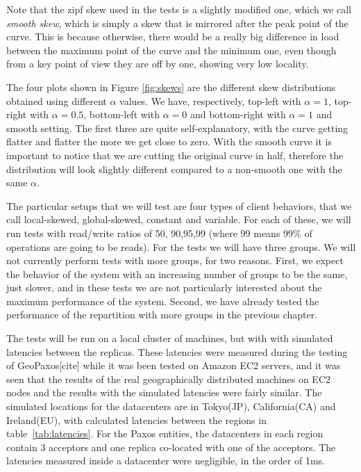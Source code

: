 Note that the zipf skew used in the tests is a slightly modified one, which we call \emph{smooth skew}, which is simply a skew that is mirrored after the peak point of the curve. This is because otherwise, there would be a really big difference in load between the maximum point of the curve and the minimum one, even though from a key point of view they are off by one, showing very low locality.

The four plots shown in Figure \ref{fig:skews} are the different skew distributions obtained using different $\alpha$ values. We have, respectively, top-left with $\alpha = 1$, top-right with $\alpha = 0.5$, bottom-left with $\alpha = 0$ and bottom-right with $\alpha = 1$ and smooth setting. The first three are quite self-explanatory, with the curve getting flatter and flatter the more we get close to zero. With the smooth curve it is important to notice that we are cutting the original curve in half, therefore the distribution will look slightly different compared to a non-smooth one with the same $\alpha$.

The particular setups that we will test are four types of client behaviors, that we call local-skewed, global-skewed, constant and variable. For each of these, we will run tests with read/write ratios of 50, 90,95,99 (where 99 means 99\% of operations are going to be reads). For the tests we will have three groups. We will not currently perform tests with more groups, for two reasons. First, we expect the behavior of the system with an increasing number of groups to be the same, just slower, and in these tests we are not particularly interested about the maximum performance of the system. Second, we have already tested the performance of the repartition with more groups in the previous chapter.

The tests will be run on a local cluster of machines, but with with simulated latencies between the replicas. These latencies were measured during the testing of GeoPaxos[cite] while it was been tested on Amazon EC2 servers, and it was seen that the results of the real geographically distributed machines on EC2 nodes and the results with the simulated latencies were fairly similar. The simulated locations for the datacenters are in Tokyo(JP), California(CA) and Ireland(EU), with calculated latencies between the regions in table~\ref{tab:latencies}. For the Paxos entities, the datacenters in each region contain 3 acceptors and one replica co-located with one of the acceptors. The latencies measured inside a datacenter were negligible, in the order of 1ms.


